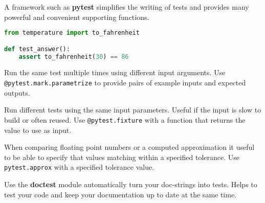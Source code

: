 \documentclass[8pt]{extarticle}
\begin{document}
\begin{navybox}[title=Using pytest]
  A framework such as \textbf{pytest} simplifies the writing of tests and
  provides many powerful and convenient supporting functions.
  \begin{bluebox}[title=A simple example]
    \begin{lstlisting}[language=Python]
from temperature import to_fahrenheit

def test_answer():
    assert to_fahrenheit(30) == 86
    \end{lstlisting}
  \end{bluebox}

  \begin{bluebox}[title=Parameterisation]
    Run the same test multiple times using different input arguments. Use
    \lstinline{@pytest.mark.parametrize} to provide pairs of example inputs and
    expected outputs.
  \end{bluebox}
  \begin{bluebox}[title=Fixtures]
    Run different tests using the same input parameters. Useful if the input is
    slow to build or often reused. Use \lstinline{@pytest.fixture} with a
    function that returns the value to use as input.
  \end{bluebox}
  \begin{bluebox}[title=Tolerances]
    When comparing floating point numbers or a computed approximation it useful
    to be able to specify that values matching within a specified tolerance. Use
    \lstinline{pytest.approx} with a specified tolerance value.
  \end{bluebox}
  \begin{bluebox}[title=Turn your documentation into tests]
    Use the \textbf{doctest} module automatically turn your doc-strings into
    tests. Helps to test your code and keep your documentation up to date at the
    same time.
  \end{bluebox}
\end{navybox}


\furtherhelp
\end{document}

